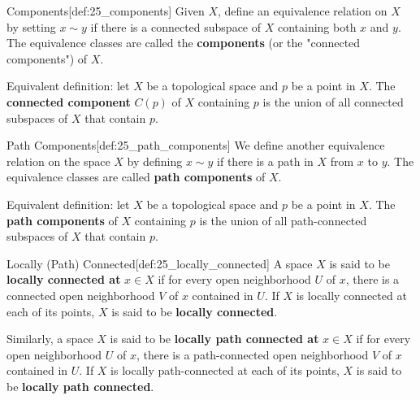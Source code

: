 \begin{defBox}{Components}[def:25_components]
    Given \( X \), define an equivalence relation on \( X \) by setting 
    \( x \sim y \) if there is a connected subspace of \( X \) containing both
    \( x \) and \( y \).
    The equivalence classes are called the \textbf{components} (or the 
    "connected components") of \( X \).

    \baseSkip

    Equivalent definition: let \( X \) be a topological space and \( p \) be a 
    point in \( X \). The \textbf{connected component} \( C ( p ) \) of \( X \)
    containing \( p \) is the union of all connected subspaces of \( X \) that
    contain \( p \).
\end{defBox}

\begin{defBox}{Path Components}[def:25_path_components]
    We define another equivalence relation on the space \( X \) by defining
    \( x \sim y \) if there is a path in \( X \) from \( x \) to \( y \).
    The equivalence classes are called \textbf{path components} of \( X \).

    \baseSkip

    Equivalent definition: let \( X \) be a topological space and \( p \) be a 
    point in \( X \). The \textbf{path components} of \( X \)
    containing \( p \) is the union of all path-connected subspaces of \( X \) 
    that contain \( p \).
\end{defBox}

\begin{defBox}{Locally (Path) Connected}[def:25_locally_connected]
    A space \( X \) is said to be \textbf{locally connected at} \( x \in X \) 
    if for every open neighborhood \( U \) of \( x \), there is a connected 
    open neighborhood \( V \) of \( x \) contained in \( U \).
    If \( X \) is locally connected at each of its points, \( X \) is said to be
    \textbf{locally connected}.

    \baseSkip

    Similarly, a space \( X \) is said to be \textbf{locally path connected at} 
    \( x \in X \) if for every open neighborhood \( U \) of \( x \), there is a 
    path-connected open neighborhood \( V \) of \( x \) contained in \( U \).
    If \( X \) is locally path-connected at each of its points, \( X \) is said 
    to be \textbf{locally path connected}.
\end{defBox}
